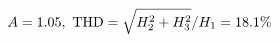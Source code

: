 \documentclass[preview]{standalone}
\begin{document}
\begin{align*}
\special{dvisvgm:raw <g id='unique000'>}A=1.05,\ \text{THD}=\sqrt{H_2^2+H_3^2}/H_1=18.1\%\special{dvisvgm:raw </g>}
\end{align*}
\end{document}
